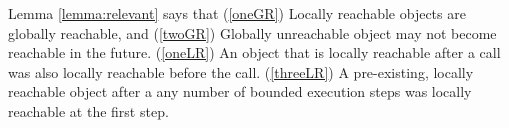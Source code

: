 Lemma  \ref{lemma:relevant} %
says that  (\ref{oneGR}) Locally reachable objects are globally reachable, and 
(\ref{twoGR}) 
Globally unreachable object may not become reachable in the future.
(\ref{oneLR}) An object that is locally reachable after a call was also locally reachable before the call.
(\ref{threeLR}) A pre-existing, locally reachable  object after a any number of bounded execution steps was locally reachable at the first step.


